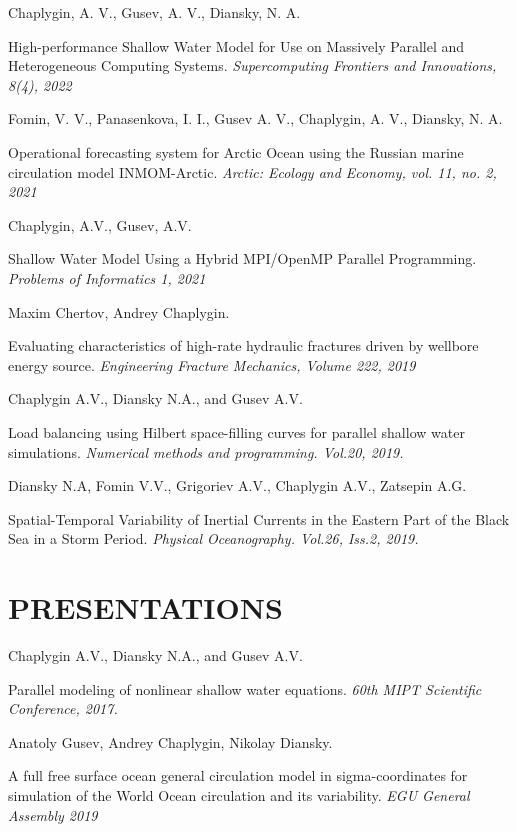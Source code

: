 \documentclass[paper=a4,fontsize=11pt]{scrartcl}
\newcommand{\sepspace}{\vspace*{1em}}		%
\newcommand{\NewPart}[1]{\section*{\uppercase{#1}}}
\begin{document}
Chaplygin, A. V., Gusev, A. V., Diansky, N. A.

High-performance Shallow Water Model for Use on Massively Parallel and Heterogeneous Computing Systems. 
\textit{Supercomputing Frontiers and Innovations, 8(4), 2022}
\sepspace

Fomin, V. V., Panasenkova, I. I., Gusev A. V., Chaplygin, A. V., Diansky, N. A.

Operational forecasting system for Arctic Ocean using the Russian marine circulation model INMOM-Arctic.
\textit{Arctic: Ecology and Economy, vol. 11, no. 2, 2021}
\sepspace

Chaplygin, A.V., Gusev, A.V. 

Shallow Water Model Using a Hybrid MPI/OpenMP Parallel Programming. 
\textit{Problems of Informatics 1, 2021}
\sepspace

Maxim Chertov, Andrey Chaplygin.

Evaluating characteristics of high-rate hydraulic fractures driven by wellbore energy source.
\textit{Engineering Fracture Mechanics, Volume 222, 2019}
\sepspace

Chaplygin A.V., Diansky N.A., and Gusev A.V. 

Load balancing using Hilbert space-filling curves for parallel shallow water simulations.
\textit{Numerical methods and programming. Vol.20, 2019.}
\sepspace

Diansky N.A, Fomin V.V., Grigoriev A.V., Chaplygin A.V., Zatsepin A.G.

Spatial-Temporal Variability of Inertial Currents
in the Eastern Part of the Black Sea in a Storm Period.
\textit{Physical Oceanography. Vol.26, Iss.2, 2019.}
\sepspace

\NewPart{Presentations}{} %

Chaplygin A.V., Diansky N.A., and Gusev A.V. 

Parallel modeling of nonlinear shallow water equations.
\textit{60th MIPT Scientific Conference, 2017.}
\sepspace

Anatoly Gusev, Andrey Chaplygin, Nikolay Diansky. 

A full free surface ocean general circulation model in sigma-coordinates for simulation of the World Ocean circulation and its variability. 
\textit{EGU General Assembly 2019} %
\sepspace
\end{document}
